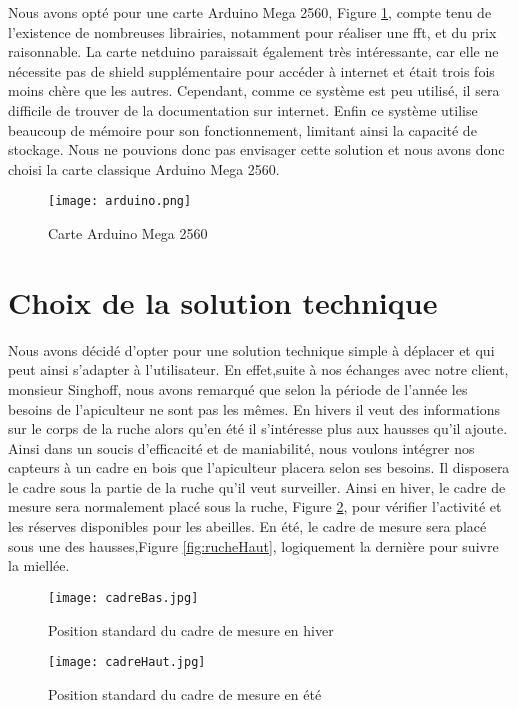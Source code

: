Nous avons opté pour une carte Arduino Mega 2560, Figure \ref{fig:arduino}, compte tenu de l'existence de nombreuses librairies, notamment pour réaliser une fft, et du prix raisonnable. La carte netduino paraissait également très intéressante, car elle ne nécessite pas de shield supplémentaire pour accéder à internet et était trois fois moins chère que les autres. Cependant, comme ce système est peu utilisé, il sera difficile de trouver de la documentation sur internet. Enfin ce système utilise beaucoup de mémoire pour son fonctionnement, limitant ainsi la capacité de stockage. Nous ne pouvions donc pas envisager cette solution et nous avons donc choisi la carte classique Arduino Mega 2560.


\begin{figure}[h]
\centering\texttt{[image: arduino.png]}
\caption{\label{fig:arduino} Carte Arduino Mega 2560}
\end{figure} 

\section{Choix de la solution technique}
\vspace{1.5cm}

Nous avons décidé d'opter pour une solution technique simple à déplacer et qui peut ainsi s'adapter à l'utilisateur.
En effet,suite à nos échanges avec notre client, monsieur Singhoff, nous avons remarqué que selon la période de l'année les besoins de l'apiculteur ne sont pas les mêmes. En hivers il veut des informations sur le corps de la ruche alors qu'en été il s'intéresse plus aux hausses qu'il ajoute. Ainsi dans un soucis d'efficacité et de maniabilité, nous voulons intégrer nos capteurs à un cadre en bois que l'apiculteur placera selon ses besoins. Il disposera le cadre sous la partie de la ruche qu'il veut surveiller. Ainsi en hiver, le cadre de mesure sera normalement placé sous la ruche, Figure \ref{fig:rucheBas}, pour vérifier l'activité et les réserves disponibles pour les abeilles. En été, le cadre de mesure sera placé sous une des hausses,Figure \ref{fig:rucheHaut}, logiquement la dernière pour suivre la miellée.
\begin{figure}[h]

\begin{minipage}[c]{.46\linewidth}
     \begin{center}
             \texttt{[image: cadreBas.jpg]}
             \caption{\label{fig:rucheBas} Position standard du cadre de mesure en hiver}
         \end{center}
   \end{minipage} \hfill
   \begin{minipage}[c]{.46\linewidth}
    \begin{center}
            \texttt{[image: cadreHaut.jpg]}
            \caption{\label{fig:rucheBas} Position standard du cadre de mesure en été}
        \end{center}
 \end{minipage}
 \end{figure}

